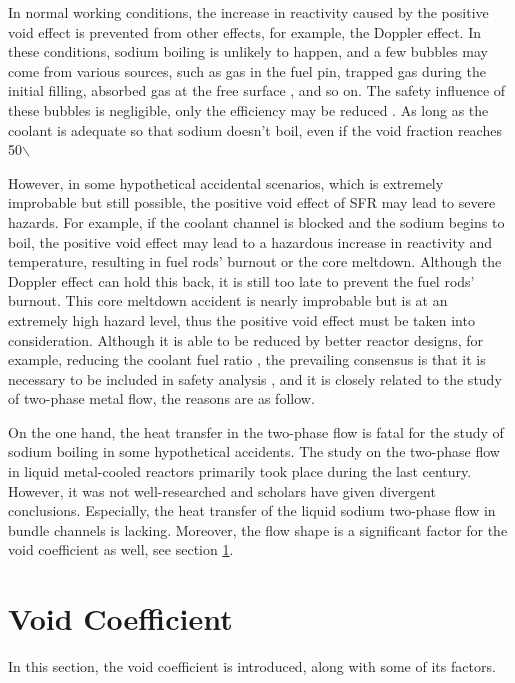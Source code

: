 \documentclass[11pt]{article}
\begin{document}
In normal working conditions, the increase in reactivity caused by the positive void effect is prevented from other effects, for example, the Doppler effect. In these conditions, sodium boiling is unlikely to happen, and a few bubbles may come from various sources, such as gas in the fuel pin, trapped gas during the initial filling, absorbed gas at the free surface \cite{parsegianSeriesMonographsTextbooks}, and so on. The safety influence of these bubbles is negligible, only the efficiency may be reduced \cite{bieberle3DShapeVelocity2024}. As long as the coolant is adequate so that sodium doesn't boil, even if the void fraction reaches 50$\backslash$%

However, in some hypothetical accidental scenarios, which is extremely improbable but still possible, the positive void effect of SFR may lead to severe hazards. For example, if the coolant channel is blocked and the sodium begins to boil, the positive void effect may lead to a hazardous increase in reactivity and temperature, resulting in fuel rods' burnout or the core meltdown. Although the Doppler effect can hold this back, it is still too late to prevent the fuel rods' burnout. This core meltdown accident is nearly improbable but is at an extremely high hazard level, thus the positive void effect must be taken into consideration. \cite{chengSafetySodiumCooledFast2021, parsegianSeriesMonographsTextbooks, schulenbergFourthGenerationNuclear2022} Although it is able to be reduced by better reactor designs, for example, reducing the coolant fuel ratio \cite{tommasiValidationSodiumVoid2010}, the prevailing consensus is that it is necessary to be included in safety analysis \cite{radmanDevelopmentNovelTwophase2021}, and it is closely related to the study of two-phase metal flow, the reasons are as follow.

On the one hand, the heat transfer in the two-phase flow is fatal for the study of sodium boiling in some hypothetical accidents. The study on the two-phase flow in liquid metal-cooled reactors primarily took place during the last century. However, it was not well-researched and scholars have given divergent conclusions. Especially, the heat transfer of the liquid sodium two-phase flow in bundle channels is lacking. \cite{wuReviewHeatTransfer2018} Moreover, the flow shape is a significant factor for the void coefficient as well, see section \ref{Void Coefficient}. 

\section{Void Coefficient}
\label{Void Coefficient}
In this section, the void coefficient is introduced, along with some of its factors.
\end{document}
